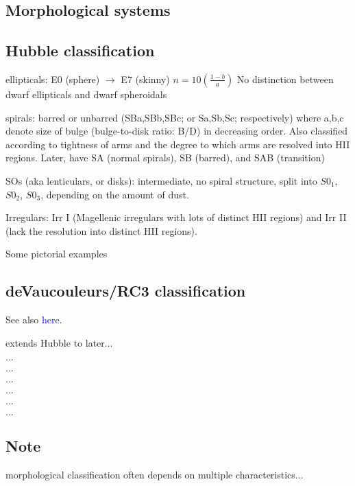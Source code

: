 \documentclass[12pt]{article}
\begin{document}
\subsection*{Morphological systems}
\subsection*{Hubble classification}
       \begin{itemize*}
           \item ellipticals:
              E0 (sphere) $\rightarrow$ E7 (skinny) $n = 10(\frac{1-b}{a})$ No
              distinction between dwarf ellipticals and dwarf spheroidals
           \item spirals: barred or unbarred (SBa,SBb,SBc; or Sa,Sb,Sc;
              respectively)
              where a,b,c denote size of bulge (bulge-to-disk ratio: B/D)
              in decreasing order. Also classified according to tightness of
              arms and the degree to which arms are resolved into HII regions.
              Later, have SA (normal spirals), SB (barred), and SAB (transition)
            \item SOs (aka lenticulars, or disks): intermediate, no spiral
                structure, split into $S0_1$, $S0_2$, $S0_3$, depending on the
                amount of dust.
            \item Irregulars: Irr I (Magellenic irregulars with lots of
                 distinct HII regions) and Irr II (lack the resolution into
                distinct HII regions).
            \item Some pictorial examples
        \end{itemize*}
\subsection*{deVaucouleurs/RC3 classification}
See also \textcolor{blue}{here}.
\begin{itemize*}
    \item extends Hubble to later$\ldots$
    \item $\ldots$
    \item $\ldots$
    \item $\ldots$
    \item $\ldots$
    \item $\ldots$
    \item $\ldots$
\end{itemize*}
\subsection{Note}
morphological classification often depends on multiple characteristics$\ldots$
\end{document}
